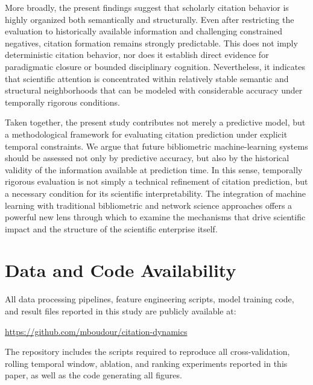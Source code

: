 \documentclass[11pt,a4paper]{article}
\begin{document}
More broadly, the present findings suggest that scholarly citation behavior is highly organized both semantically and structurally. Even after restricting the evaluation to historically available information and challenging constrained negatives, citation formation remains strongly predictable. This does not imply deterministic citation behavior, nor does it establish direct evidence for paradigmatic closure or bounded disciplinary cognition. Nevertheless, it indicates that scientific attention is concentrated within relatively stable semantic and structural neighborhoods that can be modeled with considerable accuracy under temporally rigorous conditions.

Taken together, the present study contributes not merely a predictive model, but a methodological framework for evaluating citation prediction under explicit temporal constraints. We argue that future bibliometric machine-learning systems should be assessed not only by predictive accuracy, but also by the historical validity of the information available at prediction time. In this sense, temporally rigorous evaluation is not simply a technical refinement of citation prediction, but a necessary condition for its scientific interpretability. The integration of machine learning with traditional bibliometric and network science approaches offers a powerful new lens through which to examine the mechanisms that drive scientific impact and the structure of the scientific enterprise itself.

\section*{Data and Code Availability}
All data processing pipelines, feature engineering scripts, model training
code, and result files reported in this study are publicly available at:
\begin{center}
\url{https://github.com/mboudour/citation-dynamics}
\end{center}
The repository includes the scripts required to reproduce all
cross-validation, rolling temporal window, ablation, and ranking
experiments reported in this paper, as well as the code generating
all figures.



\end{document}
